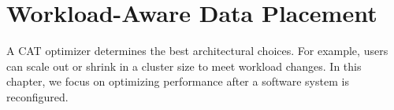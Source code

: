 \chapter{Workload-Aware Data Placement}
\label{chapter:dp}

A CAT optimizer determines the best architectural choices.
For example, users can scale out or shrink in a cluster size to meet workload changes.
In this chapter, we focus on optimizing performance after a software system
is reconfigured.





%
